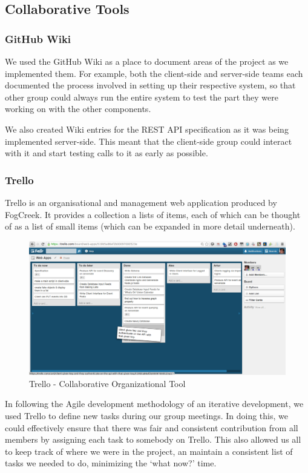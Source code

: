 \documentclass[11pt]{article}
\let\footnote=\endnote
\begin{document}
\subsection {Collaborative Tools}
\subsubsection {GitHub Wiki}
We used the GitHub Wiki as a place to document areas of the project as we implemented them. For example, both the client-side and server-side teams each documented the process involved in setting up their respective system, so that other group could always run the entire system to test the part they were working on with the other components.

We also created Wiki entries for the REST API specification as it was being implemented server-side. This meant that the client-side group could interact with it and start testing calls to it as early as possible.
\subsubsection {Trello}

Trello\footnote{\url{http://trello.com}} is an organisational and management web application produced by FogCreek. It provides a collection a lists of items, each of which can be thought of as a list of small items (which can be expanded in more detail underneath).

\begin{figure}[H]
\centering
\includegraphics[scale=0.35]{trello.png}
\caption{\label{fig:trello} Trello - Collaborative Organizational Tool}
\end{figure}
In following the Agile development methodology of an iterative development, we used Trello to define new tasks during our group meetings. In doing this, we could effectively ensure that there was fair and consistent contribution from all members by assigning each task to somebody on Trello. This also allowed us all to keep track of where we were in the project, an maintain a consistent list of tasks we needed to do, minimizing the `what now?' time.
\end{document}
